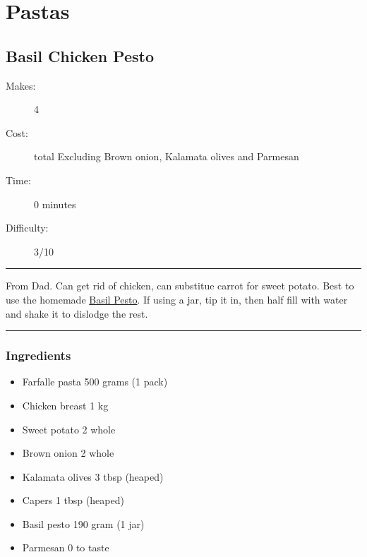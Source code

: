 \documentclass[]{article}
\begin{document}
\section*{\center\Huge\color{accent}Pastas}
\label{cat:Pastas}
\label{rec:Basil Chicken Pesto}
\subsection*{\center\huge Basil Chicken Pesto}
\begin{description}
\item[Makes:] 4 
\item[Cost:]  total Excluding Brown onion, Kalamata olives and Parmesan
\item[Time:] 0 minutes
\item[Difficulty:] 3/10
\end{description}
\vspace{0.2cm}\hrule\vspace{0.5cm}
\begin{adjustwidth}{0.5 cm}{0.5 cm}

From Dad. Can get rid of chicken, can substitue carrot for sweet potato. Best to use the homemade \hyperref[rec:Basil Pesto]{Basil Pesto}. If using a jar, tip it in, then half fill with water and shake it to dislodge the rest. \hfill{}\color{black}

\end{adjustwidth}
\vspace{0.5cm}\hrule
\subsubsection*{\Large Ingredients}
\begin{multicols}{2}
\begin{itemize}
 \item Farfalle pasta \hfill 500 grams (1 pack)
 \item Chicken breast \hfill 1 kg
 \item Sweet potato \hfill 2 whole
 \item Brown onion \hfill 2 whole
 \item Kalamata olives \hfill 3 tbsp (heaped)
 \item Capers \hfill 1 tbsp (heaped)
 \item Basil pesto \hfill 190 gram (1 jar)
 \item Parmesan \hfill 0 to taste
\end{itemize}
\end{multicols}
\end{document}
